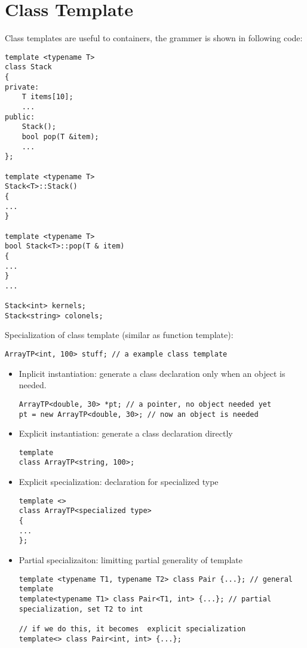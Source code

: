 \documentclass[10pt,a4paper,oneside]{article}
\begin{document}
\section{Class Template}
Class templates are useful to containers, the grammer is shown in following code:
\begin{lstlisting}
template <typename T>
class Stack
{
private:
    T items[10];
    ...
public:
    Stack();
    bool pop(T &item);
    ...
};

template <typename T>
Stack<T>::Stack()
{
...
}

template <typename T>
bool Stack<T>::pop(T & item)
{
...
}
...

Stack<int> kernels;
Stack<string> colonels;
\end{lstlisting}
Specialization of class template (similar as function template):
\begin{lstlisting}
ArrayTP<int, 100> stuff; // a example class template
\end{lstlisting}
\begin{itemize}
\item Inplicit instantiation: generate a class declaration only when an object is needed.
\begin{lstlisting}
ArrayTP<double, 30> *pt; // a pointer, no object needed yet
pt = new ArrayTP<double, 30>; // now an object is needed
\end{lstlisting}
\item Explicit instantiation: generate a class declaration directly
\begin{lstlisting}
template
class ArrayTP<string, 100>;
\end{lstlisting}
\item Explicit specialization: declaration for specialized type
\begin{lstlisting}
template <>
class ArrayTP<specialized type>
{
...
};
\end{lstlisting}
\item Partial specializaiton: limitting partial generality of template
\begin{lstlisting}
template <typename T1, typename T2> class Pair {...}; // general template
template<typename T1> class Pair<T1, int> {...}; // partial specialization, set T2 to int

// if we do this, it becomes  explicit specialization
template<> class Pair<int, int> {...};
\end{lstlisting}
\end{itemize}
\end{document}
